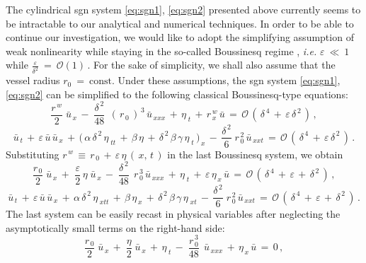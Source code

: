 \documentclass[alpha-refs, 12pt]{wiley-article}
\renewcommand{\O}{\mathcal{O}}
\newcommand{\eps}{\varepsilon}
\begin{document}
The cylindrical \acrshort{sgn} system \eqref{eq:sgn1}, \eqref{eq:sgn2} presented above currently seems to be intractable to our analytical and numerical techniques. In order to be able to continue our investigation, we would like to adopt the simplifying assumption of weak nonlinearity while staying in the so-called Boussinesq regime \citep{DMII, Dutykh2014f, Dutykh2007, DMS1}, \emph{i.e.} $\eps\ \ll\ 1$ while $\frac{\eps}{\delta^2}\ =\ \O(1)\,$. For the sake of simplicity, we shall also assume that the vessel radius $r_0\ =\ \mathrm{const}$. Under these assumptions, the \acrshort{sgn} system \eqref{eq:sgn1}, \eqref{eq:sgn2} can be simplified to the following classical Boussinesq-type equations:
\begin{equation}\label{eq:5.1}
  \frac{r^{\,w}}{2}\;\bar{u}_{\,x}\,-\;\frac{\delta^{\,2}}{48}\;\,(\,r_{\,0}\,)^{\,3}\,\bar{u}_{\,xxx}\,+\,\eta_{\;t}\,+\,r^{\,w}_{\,x}\,\bar{u}\,=\,\O\,(\,\delta^{\,4}\,+\,\eps\,\delta^{\,2}\,)\,,
\end{equation}
\begin{equation}\label{eq:5.2}
  \bar{u}_{\,t}\, + \,\eps\,\bar{u}\,\bar{u}_{\,x}\, + \,\bigl(\,\alpha\,\delta^{\,2}\,\eta_{\;tt}\, + \,\beta\,\eta\, + \,\delta^{\,2}\,\beta\,\gamma\,\eta_{\;t}\,\bigr)_{\,x}\, - \,\frac{\delta^{\,2}}{6}\;r_{\,0}^{\,2}\,\bar{u}_{\,xxt}\, =\, \O\,(\,\delta^{\,4}\,+\,\eps\,\delta^{\,2}\,)\,.
\end{equation}
Substituting $r^{\,w}\,\equiv\, r_{\,0}\,+\,\eps\,\eta\,(\,x,\,t\,)$ in the last Boussinesq system, we obtain
\begin{equation*}
  \frac{r_{\,0}}{2}\;\bar{u}_{\,x}\, + \,\,\frac{\eps}{2}\,\eta\;\bar{u}_{\,x}\, -\;\frac{\delta^{\,2}}{48}\;\,r_{\,0}^{\,3}\,\bar{u}_{\,xxx}\, + \,\eta_{\;t}\, + \,\eps\,\eta_{\,x}\,\bar{u}\, = \,\O\,(\,\delta^{\,4}\,+\,\eps\,+\,\delta^{\,2}\,)\,,
\end{equation*}
\begin{equation*}
  \bar{u}_{\,t}\, + \,\eps\,\bar{u}\,\bar{u}_{\,x}\, + \,\alpha\,\delta^{\,2}\,\eta_{\;xtt}\, + \,\beta\,\eta_{\,x}\, + \,\delta^{\,2}\,\beta\,\gamma\,\eta_{\;xt}\, - \,\frac{\delta^{\,2}}{6}\;r_{\,0}^{\,2}\,\bar{u}_{\,xxt}\, = \,\O\,(\,\delta^{\,4}\,+\,\eps\,+\,\delta^{\,2}\,)\,.
\end{equation*}
The last system can be easily recast in physical variables after neglecting the asymptotically small terms on the right-hand side:
\begin{equation}\label{eq:bouss1}
  \frac{r_{\,0}}{2}\;\bar{u}_{\,x}\,+\;\frac{\eta}{2}\;\bar{u}_{\,x}\,+\,\eta_{\;t}\,-\;\frac{r_{\,0}^{\,3}}{48}\,\;\bar{u}_{\,xxx}\,+\,\eta_{\,x}\,\bar{u}\,=\,0\,,
\end{equation}
\end{document}
